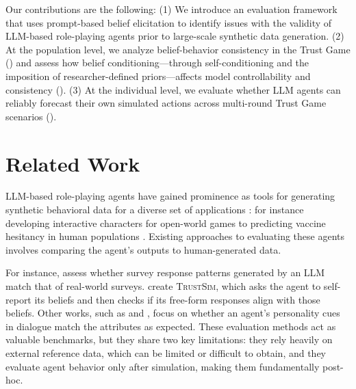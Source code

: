 \documentclass{article} %
\begin{document}
Our contributions are the following: (1) We introduce an evaluation framework that uses prompt-based belief elicitation to identify issues with the validity of LLM-based role-playing agents prior to large-scale synthetic data generation. (2) At the population level, we analyze belief-behavior consistency in the Trust Game () and assess how belief conditioning—through self-conditioning and the imposition of researcher-defined priors—affects model controllability and consistency (). (3) At the individual level, we evaluate whether LLM agents can reliably forecast their own simulated actions across multi-round Trust Game scenarios ().

\section{Related Work}
\label{sec:related_work}

LLM-based role-playing agents have gained prominence as tools for generating synthetic behavioral data for a diverse set of applications \citep{wang-etal-2024-rolellm, mannekote2025can, shao2023character, louie2024roleplay, wang2024characteristic}: for instance developing interactive characters for open-world games \citep{yan2023larp} to predicting vaccine hesitancy in human populations \citep{hou2025can}. Existing approaches to evaluating these agents involves comparing the agent's outputs to human-generated data. 



For instance, \citet{argyle2023out} assess whether survey response patterns generated by an LLM match that of real-world surveys. \citet{huang2024social} create \textsc{TrustSim}, which asks the agent to self-report its beliefs and then checks if its free-form responses align with those beliefs. Other works, such as \citet{wang2023incharacter} and \citet{Bhandari2025CanLA}, focus on whether an agent's personality cues in dialogue match the attributes as expected. These evaluation methods act as valuable benchmarks, but they share two key limitations: they rely heavily on  external reference data, which can be limited or difficult to obtain, and they evaluate agent behavior only after simulation, making them fundamentally post-hoc.
\end{document}
